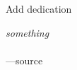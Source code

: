 \begin{frontmatter}
\makefrontmatter                                                               


\begin{dedication}                                                             
   Add dedication
\end{dedication}                                                               
\clearpage 


\begin{myepigraph} %
  \vfil                                                                        
  \vfil 
  \hfill {\it something} \\
  \vfil 
   \hfill \\
  \vfil 
  \hfill ---source
  \vfil 
\end{myepigraph}                                                               

\tableofcontents
\listoffigures  %
\listoftables   %

\begin{acknowledgements}                                                       
\end{acknowledgements}                                                         


\end{frontmatter}
